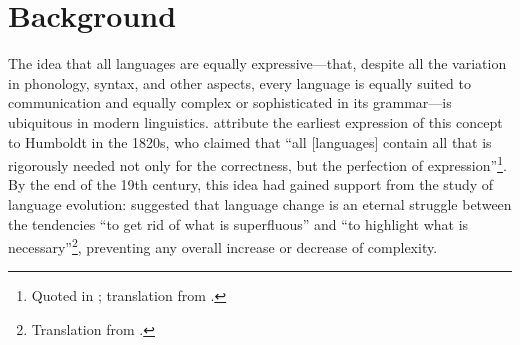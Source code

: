 \documentclass[12pt,twoside]{article}
\newcommand*{\tocref}[1]{\hyperref[{#1}]{\ref*{#1}.~\nameref*{#1}}}
\begin{document}

\section{Background}
\label{sec:bg}

The idea that all languages are equally expressive---that, despite all the variation in phonology, syntax, and other aspects, every language is equally suited to communication and equally complex or sophisticated in its grammar---is ubiquitous in modern linguistics. \citet{joseph} attribute the earliest expression of this concept to Humboldt in the 1820s, who claimed that ``all [languages] contain all that is rigorously needed not only for the correctness, but the perfection of expression''\footnote{Quoted in \cite[8]{rémusat}; translation from \cite[344]{joseph}.}. By the end of the 19th century, this idea had gained support from the study of language evolution: \citet[227]{passy} suggested that language change is an eternal struggle between the tendencies ``to get rid of what is superfluous'' and ``to highlight what is necessary''\footnote{Translation from \cite[352]{joseph}.}, preventing any overall increase or decrease of complexity.
\end{document}
